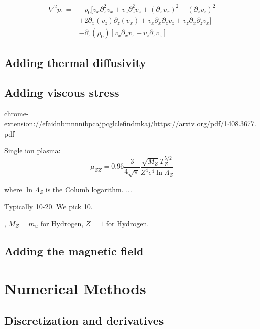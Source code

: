 \begin{align*}
    \nabla^2 p_1 =&- \rho_0 [ v_x\partial_x^2 v_x + v_z\partial_z^2 v_z + \left( \partial_x v_x \right)^2 + \left( \partial_z v_z\right)^2\\
                   &+ 2\partial_x(v_z)\partial_z(v_x) + v_x\partial_x\partial_z v_z + v_z\partial_x\partial_z v_x]\\
                    &- \partial_z \left(\rho_0\right)\left[ v_x\partial_x v_z + v_z\partial_z v_z \right]
\end{align*}



\subsection{Adding thermal diffusivity}
\subsection{Adding viscous stress}

chrome-extension://efaidnbmnnnibpcajpcglclefindmkaj/https://arxiv.org/pdf/1408.3677.pdf

Single ion plasma:
\begin{equation}
    \mu_{ZZ} = 0.96 \frac{3}{4\sqrt{\pi}}\frac{\sqrt{M_Z} T_Z^{5/2}}{Z^4 e^4 \ln\Lambda_Z}
\end{equation}

where $\ln\Lambda_Z$ is the Columb logarithm. 
\href{chrome-extension://efaidnbmnnnibpcajpcglclefindmkaj/https://www.nrl.navy.mil/Portals/38/PDF%20Files/NRL_Plasma_Formulary_2019.pdf?ver=lSvX72q0HmFwRWJWBzaI6A%3d%3d&timestamp=1612555310291}{...}

Typically 10-20. We pick 10.


, $M_Z=m_u$ for Hydrogen, $Z=1$ for Hydrogen.




\subsection{Adding the magnetic field}

\section{Numerical Methods}
\subsection{Discretization and derivatives}

